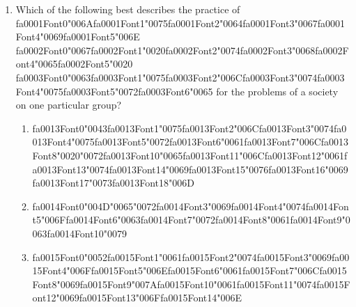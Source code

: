 \documentclass[12pt]{article}
\begin{document}
\begin{enumerate}[label=\arabic*.]
\begin{enumerate}[label=(\alph*)]
\end{enumerate}
\item Which of the following best describes the practice of {\csname fa0001Font0\endcsname\char"006A}{\csname fa0001Font1\endcsname\char"0075}{\csname fa0001Font2\endcsname\char"0064}{\csname fa0001Font3\endcsname\char"0067}{\csname fa0001Font4\endcsname\char"0069}{\csname fa0001Font5\endcsname\char"006E} {\csname fa0002Font0\endcsname\char"0067}{\csname fa0002Font1\endcsname\char"0020}{\csname fa0002Font2\endcsname\char"0074}{\csname fa0002Font3\endcsname\char"0068}{\csname fa0002Font4\endcsname\char"0065}{\csname fa0002Font5\endcsname\char"0020} {\csname fa0003Font0\endcsname\char"0063}{\csname fa0003Font1\endcsname\char"0075}{\csname fa0003Font2\endcsname\char"006C}{\csname fa0003Font3\endcsname\char"0074}{\csname fa0003Font4\endcsname\char"0075}{\csname fa0003Font5\endcsname\char"0072}{\csname fa0003Font6\endcsname\char"0065} for the problems of a society on one particular group?
\begin{enumerate}[label=(\alph*)]
    \item {\csname fa0013Font0\endcsname\char"0043}{\csname fa0013Font1\endcsname\char"0075}{\csname fa0013Font2\endcsname\char"006C}{\csname fa0013Font3\endcsname\char"0074}{\csname fa0013Font4\endcsname\char"0075}{\csname fa0013Font5\endcsname\char"0072}{\csname fa0013Font6\endcsname\char"0061}{\csname fa0013Font7\endcsname\char"006C}{\csname fa0013Font8\endcsname\char"0020}{\char"0072}{\csname fa0013Font10\endcsname\char"0065}{\csname fa0013Font11\endcsname\char"006C}{\csname fa0013Font12\endcsname\char"0061}{\csname fa0013Font13\endcsname\char"0074}{\csname fa0013Font14\endcsname\char"0069}{\csname fa0013Font15\endcsname\char"0076}{\csname fa0013Font16\endcsname\char"0069}{\csname fa0013Font17\endcsname\char"0073}{\csname fa0013Font18\endcsname\char"006D}
    \item {\csname fa0014Font0\endcsname\char"004D}{\char"0065}{\char"0072}{\csname fa0014Font3\endcsname\char"0069}{\csname fa0014Font4\endcsname\char"0074}{\csname fa0014Font5\endcsname\char"006F}{\csname fa0014Font6\endcsname\char"0063}{\csname fa0014Font7\endcsname\char"0072}{\csname fa0014Font8\endcsname\char"0061}{\csname fa0014Font9\endcsname\char"0063}{\csname fa0014Font10\endcsname\char"0079}
    \item {\csname fa0015Font0\endcsname\char"0052}{\csname fa0015Font1\endcsname\char"0061}{\csname fa0015Font2\endcsname\char"0074}{\csname fa0015Font3\endcsname\char"0069}{\csname fa0015Font4\endcsname\char"006F}{\csname fa0015Font5\endcsname\char"006E}{\csname fa0015Font6\endcsname\char"0061}{\csname fa0015Font7\endcsname\char"006C}{\csname fa0015Font8\endcsname\char"0069}{\csname fa0015Font9\endcsname\char"007A}{\csname fa0015Font10\endcsname\char"0061}{\csname fa0015Font11\endcsname\char"0074}{\csname fa0015Font12\endcsname\char"0069}{\csname fa0015Font13\endcsname\char"006F}{\csname fa0015Font14\endcsname\char"006E}

\end{enumerate}
\end{enumerate}
\end{document}
